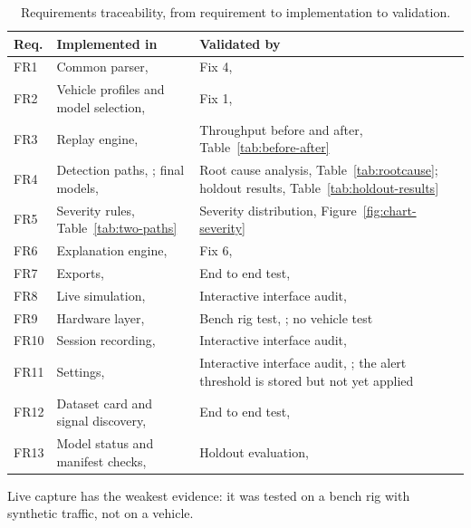 \begin{table}[H]
\centering
\footnotesize
\caption{Requirements traceability, from requirement to implementation to validation.}
\label{tab:traceability}
\begin{tabularx}{\textwidth}{|P{1.1cm}|P{6.0cm}|Y|}
\hline
\textbf{Req.} & \textbf{Implemented in} & \textbf{Validated by} \\
\hline
FR1 & Common parser,  & Fix 4,  \\
\hline
FR2 & Vehicle profiles and model selection,  & Fix 1,  \\
\hline
FR3 & Replay engine,  & Throughput before and after, Table~\ref{tab:before-after} \\
\hline
FR4 & Detection paths, ; final models,  & Root cause analysis, Table~\ref{tab:rootcause}; holdout results, Table~\ref{tab:holdout-results} \\
\hline
FR5 & Severity rules, Table~\ref{tab:two-paths} & Severity distribution, Figure~\ref{fig:chart-severity} \\
\hline
FR6 & Explanation engine,  & Fix 6,  \\
\hline
FR7 & Exports,  & End to end test,  \\
\hline
FR8 & Live simulation,  & Interactive interface audit,  \\
\hline
FR9 & Hardware layer,  & Bench rig test, ; no vehicle test \\
\hline
FR10 & Session recording,  & Interactive interface audit,  \\
\hline
FR11 & Settings,  & Interactive interface audit, ; the alert threshold is stored but not yet applied \\
\hline
FR12 & Dataset card and signal discovery,  & End to end test,  \\
\hline
FR13 & Model status and manifest checks,  & Holdout evaluation,  \\
\hline
\end{tabularx}
\end{table}

Live capture has the weakest evidence: it was tested on a bench rig with synthetic traffic, not on a vehicle.

